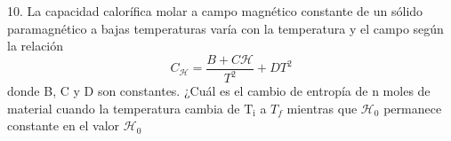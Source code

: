 10. La capacidad calorífica molar a campo magnético constante de un sólido paramagnético a bajas temperaturas varía con la temperatura y el campo según la relación
$$
C_{\mathscr{H}}=\frac{B+C \mathscr{H}}{T^2}+D T^2
$$
donde B, C y D son constantes. ¿Cuál es el cambio de entropía de n moles de material cuando la temperatura cambia de $\mathrm{T_i}$ a $T_f$ mientras que $\mathscr{H}_{0}$ permanece constante en el valor $\mathscr{H_0}$ 